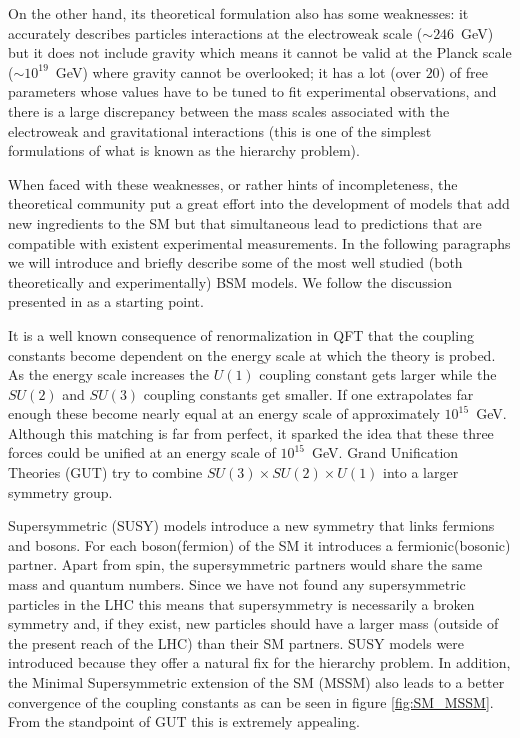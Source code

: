 On the other hand, its theoretical formulation also has some weaknesses: it accurately describes particles interactions at the electroweak scale ($\sim 246$~GeV) but it does not include gravity which means it cannot be valid at the Planck scale ($\sim 10^{19}$~GeV) where gravity cannot be overlooked; it has a lot (over $20$) of free parameters whose values have to be tuned to fit experimental observations, and there is a large discrepancy between the mass scales associated with the electroweak and gravitational interactions (this is one of the simplest formulations of what is known as the hierarchy problem).

When faced with these weaknesses, or rather hints of incompleteness, the theoretical community put a great effort into the development of models that add new ingredients to the SM but that simultaneous lead to predictions that are compatible with existent experimental measurements. In the following paragraphs we will introduce and briefly describe some of the most well studied (both theoretically and experimentally) BSM models. We follow the discussion presented in \cite{BSM_motivation} as a starting point.

It is a well known consequence of renormalization in QFT that the coupling constants become dependent on the energy scale at which the theory is probed. As the energy scale increases the $U(1)$ coupling constant gets larger while the $SU(2)$ and $SU(3)$ coupling constants get smaller. If one extrapolates far enough these become nearly equal at an energy scale of approximately $10^{15}$~GeV. Although this matching is far from perfect, it sparked the idea that these three forces could be unified at an energy scale of $10^{15}$~GeV. Grand Unification Theories (GUT) try to combine $SU(3)\times SU(2)\times U(1)$ into a larger symmetry group.

Supersymmetric (SUSY) models introduce a new symmetry that links fermions and bosons. For each boson(fermion) of the SM it introduces a fermionic(bosonic) partner. Apart from spin, the supersymmetric partners would share the same mass and quantum numbers. Since we have not found any supersymmetric particles in the LHC this means that supersymmetry is necessarily a broken symmetry and, if they exist, new particles should have a larger mass (outside of the present reach of the LHC) than their SM partners. SUSY models were introduced because they offer a natural fix for the hierarchy problem. In addition, the Minimal Supersymmetric extension of the SM (MSSM) also leads to a better convergence of the coupling constants as can be seen in figure \ref{fig:SM_MSSM}. From the standpoint of GUT this is extremely appealing.

